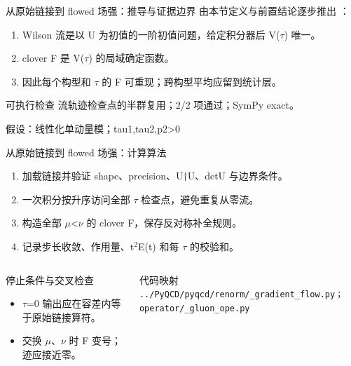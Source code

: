 \begin{frame}[t]{从原始链接到 flowed 场强：推导与证据边界}
\footnotesize
{}\quad 由本节定义与前置结论逐步推出 ：
\begin{enumerate}
\item Wilson 流是以 U 为初值的一阶初值问题，给定积分器后 V(\ensuremath{\tau}) 唯一。
\item clover F 是 V(\ensuremath{\tau}) 的局域确定函数。
\item 因此每个构型和 \ensuremath{\tau} 的 F 可重现；跨构型平均应留到统计层。
\end{enumerate}\begin{block}{可执行检查}
\quad 流轨迹检查点的半群复用；2/2 项通过；SymPy exact。
\par\scriptsize 假设：线性化单动量模；tau1,tau2,p2>0
\end{block}
\end{frame}

\begin{frame}[t]{从原始链接到 flowed 场强：计算算法}
\footnotesize
{}\begin{enumerate}
\item 加载链接并验证 shape、precision、U†U、detU 与边界条件。
\item 一次积分按升序访问全部 \ensuremath{\tau} 检查点，避免重复从零流。
\item 构造全部 \ensuremath{\mu}<\ensuremath{\nu} 的 clover F，保存反对称补全规则。
\item 记录步长收敛、作用量、t\ensuremath{^{2}}E(t) 和每 \ensuremath{\tau} 的校验和。
\end{enumerate}\begin{columns}[T,onlytextwidth]
\begin{block}{停止条件与交叉检查}\scriptsize\begin{itemize}
\item[\CheckMark] \ensuremath{\tau}=0 输出应在容差内等于原始链接算符。
\item[\CheckMark] 交换 \ensuremath{\mu}、\ensuremath{\nu} 时 F 变号；迹应接近零。
\end{itemize}\end{block}
\begin{block}{代码映射}
\scriptsize \texttt{.\allowbreak{}.\allowbreak{}/\allowbreak{}PyQCD/\allowbreak{}pyqcd/\allowbreak{}renorm/\allowbreak{}\_\allowbreak{}gradient\_\allowbreak{}flow.\allowbreak{}py；operator/\allowbreak{}\_\allowbreak{}gluon\_\allowbreak{}ope.\allowbreak{}py}
\end{block}\end{columns}\end{frame}

